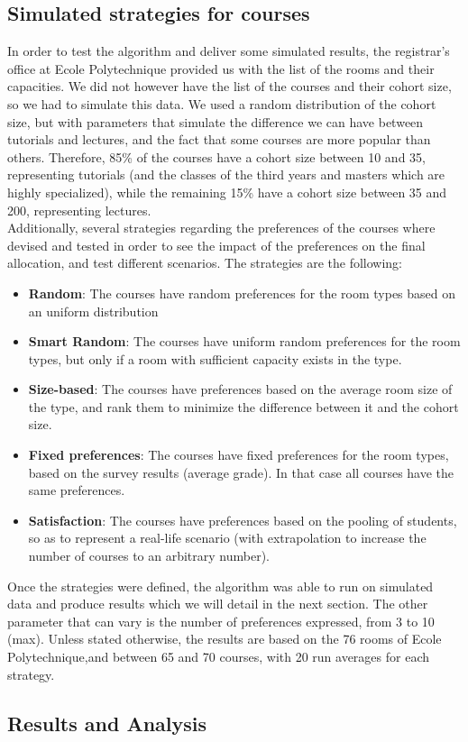 \documentclass[a4paper, oneside]{article}
\theoremstyle{plain}
\begin{document}
\subsection{Simulated strategies for courses}

In order to test the algorithm and deliver some simulated results, the registrar's office at Ecole Polytechnique provided us with the list of the rooms and their capacities. 
We did not however have the list of the courses and their cohort size, so we had to simulate this data. We used a random distribution of the cohort size, but with parameters that 
simulate the difference we can have between tutorials and lectures, and the fact that some courses are more popular than others. Therefore, 85\% of the courses have a cohort size between 10 and 35,
representing tutorials (and the classes of the third years and masters which are highly specialized), while the remaining 15\% have a cohort size between 35 and 200, representing lectures.\\

Additionally, several strategies regarding the preferences of the courses where devised and tested in order to see the impact of the preferences on the final allocation, and test different 
scenarios. The strategies are the following:

\begin{itemize}
	\item \textbf{Random}: The courses have random preferences for the room types based on an uniform distribution
	\item \textbf{Smart Random}: The courses have uniform random preferences for the room types, but only if a room with sufficient capacity exists in the type. 
	\item \textbf{Size-based}: The courses have preferences based on the average room size of the type, and rank them to minimize the difference between it and the cohort size.
	\item \textbf{Fixed preferences}: The courses have fixed preferences for the room types, based on the survey results (average grade). In that case all courses have the same preferences.
	\item \textbf{Satisfaction}: The courses have preferences based on the pooling of students, so as to represent a real-life scenario (with extrapolation to increase the number of courses to an arbitrary number).
\end{itemize}

Once the strategies were defined, the algorithm was able to run on simulated data and produce results which we will detail in the next section. The other parameter that can vary is the number of preferences 
expressed, from 3 to 10 (max). Unless stated otherwise, the results are based on the 76 rooms of Ecole Polytechnique,and between 65 and 70 courses, with 20 run averages for each strategy.

\subsection{Results and Analysis}
\end{document}
